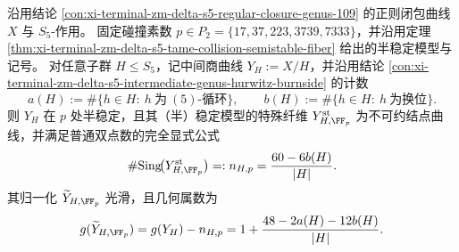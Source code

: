 \begin{theorem}[碰撞素数处中间商曲线的节点计数律]\label{thm:xi-terminal-zm-delta-s5-intermediate-quotient-collision-nodal-count}
沿用结论 \ref{con:xi-terminal-zm-delta-s5-regular-closure-genus-109} 的正则闭包曲线 \(X\) 与 \(S_5\)-作用。
固定碰撞素数 \(p\in P_2=\{17,37,223,3739,7333\}\)，并沿用定理 \ref{thm:xi-terminal-zm-delta-s5-tame-collision-semistable-fiber} 给出的半稳定模型与记号。
对任意子群 \(H\le S_5\)，记中间商曲线 \(Y_H:=X/H\)，并沿用结论 \ref{con:xi-terminal-zm-delta-s5-intermediate-genus-hurwitz-burnside} 的计数
\[
a(H):=\#\{h\in H:\ h\ \text{为}\ (5)\text{-循环}\},\qquad
b(H):=\#\{h\in H:\ h\ \text{为换位}\}.
\]
则 \(Y_H\) 在 \(p\) 处半稳定，且其（半）稳定模型的特殊纤维 \(Y^{\mathrm{st}}_{H,\FF_p}\) 为不可约结点曲线，并满足普通双点数的完全显式公式
\[
\#\mathrm{Sing}\!\bigl(Y^{\mathrm{st}}_{H,\FF_p}\bigr)=:n_{H,p}=\frac{60-6b(H)}{|H|}.
\]
其归一化 \(\widetilde Y_{H,\FF_p}\) 光滑，且几何属数为
\[
g(\widetilde Y_{H,\FF_p})
=g(Y_H)-n_{H,p}
=1+\frac{48-2a(H)-12b(H)}{|H|}.
\]
\end{theorem}
